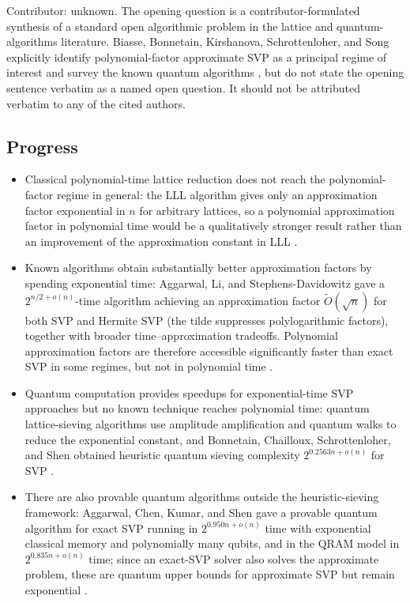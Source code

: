 Contributor: unknown.  The opening question is a contributor-formulated
synthesis of a standard open algorithmic problem in the lattice and
quantum-algorithms literature.  Biasse, Bonnetain, Kirshanova,
Schrottenloher, and Song explicitly identify polynomial-factor approximate
SVP as a principal regime of interest and survey the known quantum
algorithms
, but do not state the opening sentence
verbatim as a named open question.  It should not be attributed verbatim to
any of the cited authors.

\subsection*{Progress}

\begin{itemize}
  \item Classical polynomial-time lattice reduction does not reach the
polynomial-factor regime in general: the LLL algorithm gives only an
approximation factor exponential in $n$ for arbitrary lattices, so a
polynomial approximation factor in polynomial time would be a qualitatively
stronger result rather than an improvement of the approximation constant in
LLL
.

  \item Known algorithms obtain substantially better approximation factors by
spending exponential time: Aggarwal, Li, and Stephens-Davidowitz gave a
$2^{n/2+o(n)}$-time algorithm achieving an approximation factor
$\widetilde O(\sqrt{n})$ for both SVP and Hermite SVP (the tilde
suppresses polylogarithmic factors), together with broader
time--approximation tradeoffs.  Polynomial approximation factors are
therefore accessible significantly faster than exact SVP in some regimes,
but not in polynomial time
.

  \item Quantum computation provides speedups for exponential-time SVP
approaches but no known technique reaches polynomial time: quantum
lattice-sieving algorithms use amplitude amplification and quantum walks to
reduce the exponential constant, and Bonnetain, Chailloux, Schrottenloher,
and Shen obtained heuristic quantum sieving complexity
$2^{0.2563n+o(n)}$ for SVP
.

  \item There are also provable quantum algorithms outside the heuristic-sieving
framework: Aggarwal, Chen, Kumar, and Shen gave a provable quantum algorithm
for exact SVP running in $2^{0.950n+o(n)}$ time with exponential classical
memory and polynomially many qubits, and in the QRAM model in
$2^{0.835n+o(n)}$ time; since an exact-SVP solver also solves the
approximate problem, these are quantum upper bounds for approximate SVP but
remain exponential
.


\end{itemize}
